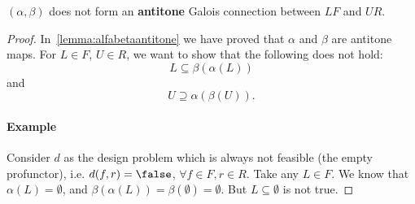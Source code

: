 

\begin{lemma} $(\alpha, \beta)$ does not form an \textbf{antitone} Galois connection between $LF$ and $UR$.
\end{lemma}
\begin{proof}
In~\cref{lemma:alfabetaantitone} we have proved that $\alpha$ and $\beta$ are antitone maps. For $L\in F$, $U\in R$, we want to show that the following does not hold:
\begin{equation}
\label{eq:alfabetafirst}
    L\subseteq \beta(\alpha(L))
\end{equation}
and
\begin{equation}
\label{eq:alfabetasec}
     U\supseteq \alpha(\beta(U)).
\end{equation}
\paragraph{Example} Consider $d$ as the design problem which is always not feasible (the empty profunctor), i.e. $d(f,r)=\false$, $\forall f\in F,r\in R$. Take any $L\in F$. We know that $\alpha(L)=\emptyset$, and $\beta(\alpha(L))=\beta(\emptyset)=\emptyset$. But $L\subseteq \emptyset$ is not true.

\end{proof}






